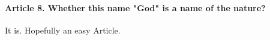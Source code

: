 \documentclass{ucetd}
\begin{document}

\paragraph{Article 8. Whether this name "God" is a name of the nature?}
It is. Hopefully an easy Article.
\end{document}
